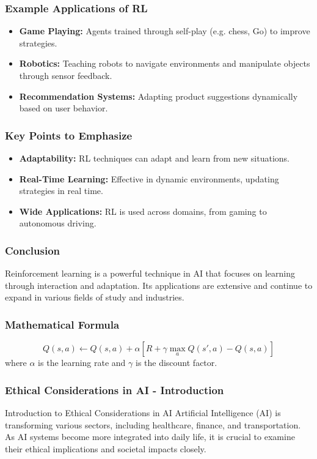 \documentclass[aspectratio=169]{beamer}
\begin{document}
\begin{frame}[fragile]
    \frametitle{Example Applications of RL}
    \begin{itemize}
        \item \textbf{Game Playing:} Agents trained through self-play (e.g. chess, Go) to improve strategies.
        \item \textbf{Robotics:} Teaching robots to navigate environments and manipulate objects through sensor feedback.
        \item \textbf{Recommendation Systems:} Adapting product suggestions dynamically based on user behavior.
    \end{itemize}
\end{frame}

\begin{frame}[fragile]
    \frametitle{Key Points to Emphasize}
    \begin{itemize}
        \item \textbf{Adaptability:} RL techniques can adapt and learn from new situations.
        \item \textbf{Real-Time Learning:} Effective in dynamic environments, updating strategies in real time.
        \item \textbf{Wide Applications:} RL is used across domains, from gaming to autonomous driving.
    \end{itemize}
\end{frame}

\begin{frame}[fragile]
    \frametitle{Conclusion}
    Reinforcement learning is a powerful technique in AI that focuses on learning through interaction and adaptation. Its applications are extensive and continue to expand in various fields of study and industries.
\end{frame}

\begin{frame}[fragile]
    \frametitle{Mathematical Formula}
    \begin{equation}
        Q(s, a) \leftarrow Q(s, a) + \alpha \left[ R + \gamma \max_a Q(s', a) - Q(s, a) \right]
    \end{equation}
    where $\alpha$ is the learning rate and $\gamma$ is the discount factor.
\end{frame}

\begin{frame}[fragile]
    \frametitle{Ethical Considerations in AI - Introduction}
    \begin{block}{Introduction to Ethical Considerations in AI}
        Artificial Intelligence (AI) is transforming various sectors, including healthcare, finance, and transportation. 
        As AI systems become more integrated into daily life, it is crucial to examine their ethical implications and societal impacts closely.
    \end{block}
\end{frame}
\end{document}
